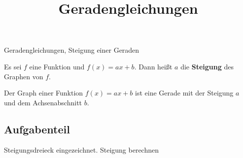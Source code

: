 \documentclass{uebungsblatt}
\title{Geradengleichungen}
\begin{document}
\maketitle
\begin{contents}
    Geradengleichungen, Steigung einer Geraden
\end{contents}


\begin{definition}
    Es sei $f$ eine Funktion und $f(x)=ax+b$. Dann heißt $a$ die \textbf{Steigung} des Graphen von $f$.
\end{definition}

\begin{theorem}
    Der Graph einer Funktion $f(x)=ax+b$ ist eine Gerade mit der Steigung $a$ und dem Achsenabschnitt $b$.
\end{theorem}

\subsection*{Aufgabenteil}

Steigungsdreieck eingezeichnet. Steigung berechnen

\end{document}
